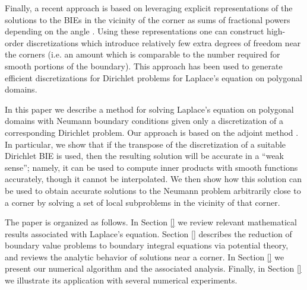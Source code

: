  Finally, a recent approach is based on leveraging explicit representations of the solutions to the BIEs in the vicinity of the corner as sums of fractional powers depending on the angle \cite{}. Using these representations one can construct high-order discretizations which introduce relatively few extra degrees of freedom near the corners (i.e. an amount which is comparable to the number required for smooth portions of the boundary). This approach has been used to generate efficient discretizations for Dirichlet problems for Laplace's equation on polygonal domains\cite{}. 
 
 In this paper we describe a method for solving Laplace's equation on polygonal domains with Neumann boundary conditions given only a discretization of a corresponding Dirichlet problem. Our approach is based on the adjoint method \cite{}. In particular, we show that if the transpose of the discretization of a suitable Dirichlet BIE is used, then the resulting solution will be accurate in a ``weak sense''; namely, it can be used to compute inner products with smooth functions accurately, though it cannot be interpolated. We then show how this solution can be used to obtain accurate solutions to the Neumann problem arbitrarily close to a corner by solving a set of local subproblems in the vicinity of that corner.
 
 The paper is organized as follows. In Section \ref{} we review relevant mathematical results associated with Laplace's equation. Section \ref{} describes the reduction of boundary value problems to boundary integral equations via potential theory, and reviews the analytic behavior of solutions near a corner. In Section \ref{} we present our numerical algorithm and the associated analysis. Finally, in Section \ref{} we illustrate its application with several numerical experiments.